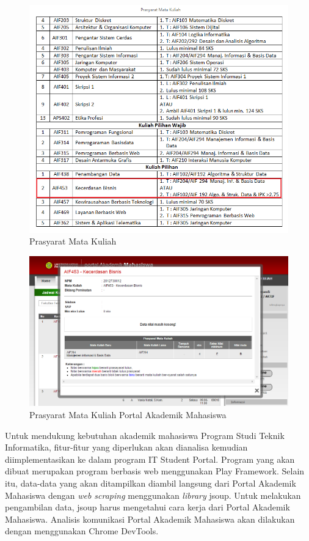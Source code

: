 \begin{figure}[H]
	\centering
	\includegraphics[scale=0.5]{Gambar/contoh-tinyurl}
	\caption{Prasyarat Mata Kuliah\cite{prasyaratIT}}
	\label{fig:1_prasyarat_tinyurl}
\end{figure}

\begin{figure}[H]
	\centering
	\includegraphics[scale=0.5]{Gambar/contoh-portal}
	\caption{Prasyarat Mata Kuliah Portal Akademik Mahasiswa\cite{studentportalunpar}}
	\label{fig:1_prasyarat_student_portal}
\end{figure}

Untuk mendukung kebutuhan akademik mahasiswa Program Studi Teknik Informatika, fitur-fitur yang diperlukan akan dianalisa kemudian diimplementasikan ke dalam program IT Student Portal. Program yang akan dibuat merupakan program berbasis web menggunakan Play Framework. Selain itu, data-data yang akan ditampilkan diambil langsung dari Portal Akademik Mahasiswa dengan \textit{web scraping} menggunakan \textit{library} jsoup. Untuk melakukan pengambilan data, jsoup harus mengetahui cara kerja dari Portal Akademik Mahasiswa. Analisis komunikasi Portal Akademik Mahasiswa akan dilakukan dengan menggunakan Chrome DevTools. 

